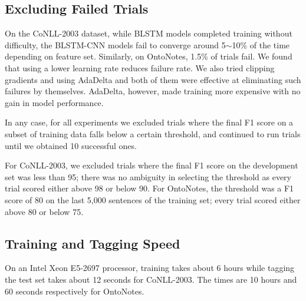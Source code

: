 \documentclass[11pt,letterpaper]{article}
\begin{document}
\subsection{Excluding Failed Trials}
\label{sec:failed-trials}
On the CoNLL-2003 dataset, while BLSTM models completed training without difficulty, the BLSTM-CNN models fail to converge around 5$\sim$10\% of the time depending on feature set. Similarly, on OntoNotes, 1.5\% of trials fail. We found that using a lower learning rate
 reduces failure rate. %
 We also tried clipping gradients and using AdaDelta and both of them were effective at eliminating such failures by themselves.
 AdaDelta, however, made training more expensive with no gain in model performance.

In any case, for all experiments we excluded trials where the final F1 score on a subset of training data falls below a certain threshold, and continued to run trials until we obtained 10 successful ones. 

For CoNLL-2003, we excluded trials where the final F1 score on the development set was less than 95; there was no ambiguity in selecting the threshold as every trial scored either above 98 or below 90. For OntoNotes, the threshold was a F1 score of 80 on the last 5,000 sentences of the training set; every trial scored either above 80 or below 75.

\subsection{Training and Tagging Speed}
On an Intel Xeon E5-2697 processor, training takes about 6 hours while tagging the test set takes about 12 seconds for CoNLL-2003. The times are 10 hours and 60 seconds respectively for OntoNotes.
\end{document}
